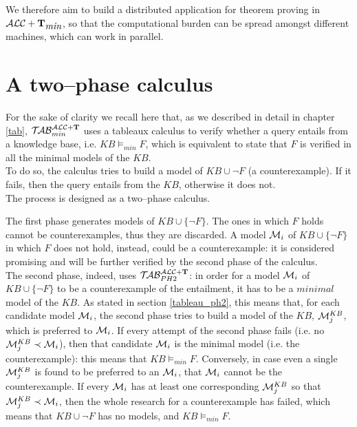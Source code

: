 \documentclass[a4paper, 11pt, oneside]{duthesis}
\newcommand{\tip}{{\bf T}}
\newcommand{\alctmin}{\mathcal{ALC}+\tip_{\mbox{\em min}}}
\newcommand{\unione} {\cup}
\newcommand{\nott} {\lnot}
\newcommand{\emme} {\begin{mathcal}M\end{mathcal}}
\newcommand{\nuovoc}{\mathrel{{\mathcal{T}\!\mathcal{AB}}}_{min}^{\mathcal{ALC}+\mbox{\scriptsize $\tip$}}}
\newcommand{\secondo}{\mathrel{{\mathcal{T}\!\mathcal{AB}}}_{PH 2}^{\mathcal{ALC}+\mbox{\scriptsize $\tip$}}}
\begin{document}
We therefore aim to build a distributed application for theorem proving in $\alctmin$, so that the computational burden can be spread amongst different machines, which can work in parallel.

\newpage

\section{A two--phase calculus}\label{calc_2ph}
For the sake of clarity we recall here that, as we described in detail in chapter \ref{tab}, $\nuovoc$ uses a tableaux calculus to verify whether a query entails from a knowledge base, i.e. $KB \models_{min} F$, which is equivalent to state that $F$ is verified in all the minimal models of the $KB$.\\
To do so, the calculus tries to build a model of $KB \unione \neg F$ (a counterexample). If it fails, then the query entails from the $KB$, otherwise it does not.\\

The process is designed as a two--phase calculus.

The first phase generates models of $KB \unione \{\nott F\}$. The ones in which $F$ holds cannot be counterexamples, thus they are discarded. A model $\emme_i$ of $KB \unione \{\nott F\}$ in which $F$ does not hold, instead, could be a counterexample: it is considered promising and will be further verified by the second phase of the calculus.\\
The second phase, indeed, uses $\secondo$: in order for a model $\emme_i$ of $KB \unione \{\nott F\}$ to be a counterexample of the entailment, it has to be a $minimal$ model of the $KB$. As stated in section \ref{tableau_ph2}, this means that, for each candidate model $\emme_i$, the second phase tries to build a model of the $KB$, $\emme_j^{KB}$, which is preferred to $\emme_i$. If every attempt of the second phase fails (i.e. no $\emme_j^{KB} \prec \emme_i$), then that candidate $\emme_i$ is the minimal model (i.e. the counterexample): this means that $KB \models_{min} F$.
Conversely, in case even a single $\emme_j^{KB}$ is found to be preferred to an $\emme_i$, that $\emme_i$ cannot be the counterexample.
If every $\emme_i$ has at least one corresponding $\emme_j^{KB}$ so that $\emme_j^{KB} \prec \emme_i$, then the whole research for a counterexample has failed, which means that $KB \unione \neg F$ has no models, and $KB \models_{min} F$.\\

\end{document}

